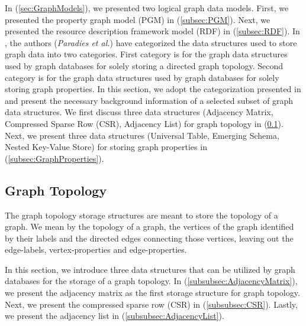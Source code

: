 {In (\ref{sec:GraphModels}), we presented two logical graph data models. First, we presented the property graph model (PGM) in (\ref{subsec:PGM}). Next, we presented the resource description framework model (RDF) in (\ref{subsec:RDF}). In \cite{Paradies2017},  the authors (\textit{Paradies et al.}) have categorized the data structures used to store graph data into two categories. First category is for the graph data structures used by graph databases for solely storing a directed graph topology. Second category is for the graph data structures used by graph databases for solely storing graph properties. In this section, we adopt the categorization presented in \cite{Paradies2017} and present the necessary background information of a selected subset of graph data structures. We first discuss three data structures (Adjacency Matrix, Compressed Sparse Row (CSR), Adjacency List) for graph topology in (\ref{subsec:GraphTopology}). Next, we present three data structures (Universal Table, Emerging Schema, Nested Key-Value Store) for storing graph properties in (\ref{subsec:GraphProperties}).


\subsection{Graph Topology}
\label{subsec:GraphTopology}

The graph topology storage structures are meant to store the topology of a graph. We mean by the topology of a graph, the vertices of the graph identified by their labels and the directed edges connecting those vertices, leaving out the edge-labels, vertex-properties and edge-properties.

In this section, we introduce three data structures that can be utilized by graph databases for the storage of a graph topology. In (\ref{subsubsec:AdjacencyMatrix}), we present the adjacency matrix as the first storage structure for graph topology. Next, we present the compressed sparse row (CSR) in (\ref{subsubsec:CSR}). Lastly, we present the adjacency list in (\ref{subsubsec:AdjacencyList}).


}
